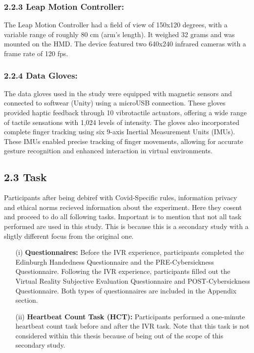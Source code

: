 \documentclass[12pt,oneside,openright]{report}
\begin{document}
\subsubsection*{2.2.3 Leap Motion Controller:}
The Leap Motion Controller had a field of view of 150x120 degrees, with a variable range of roughly 80 cm (arm's length). It weighed 32 grams and was mounted on the HMD. The device featured two 640x240 infrared cameras with a frame rate of 120 fps.

\subsubsection*{2.2.4 Data Gloves:}
The data gloves used in the study were equipped with magnetic sensors and connected to softwear (Unity) using a microUSB connection. These gloves provided haptic feedback through 10 vibrotactile actuators, offering a wide range of tactile sensations with 1,024 levels of intensity. The gloves also incorporated complete finger tracking using six 9-axis Inertial Measurement Units (IMUs). These IMUs enabled precise tracking of finger movements, allowing for accurate gesture recognition and enhanced interaction in virtual environments.


\subsection*{2.3 Task}

Participants after being debiref with Covid-Specific rules, information privacy and ethical norms recieved information about the experiment. Here they cosent and proceed to do all following tasks. Important is to mention that not all task performed are used in this study. This is because this is a secondary study with a sligtly different focus from the original one. 

\begin{enumerate}
\item[(i)] \textbf{Questionnaires:} Before the IVR experience, participants completed the Edinburgh Handedness Questionnaire and the PRE-Cybersickness Questionnaire. Following the IVR experience, participants filled out the Virtual Reality Subjective Evaluation Questionnaire and POST-Cybersickness Questionnaire. Both types of questionnaires are included in the Appendix section.

\item[(ii)] \textbf{Heartbeat Count Task (HCT):} Participants performed a one-minute heartbeat count task before and after the IVR task. Note that this task is not considered within this thesis because of being out of the scope of this secondary study.
\end{enumerate}
\end{document}
